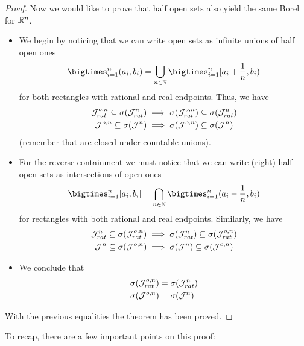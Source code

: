 \begin{proof}
	Now we would like to prove that half open sets also yield the same Borel \siga for $\mathbb{R}^n$.
	\begin{itemize}
		\item We begin by noticing that we can write open sets as infinite unions of half open ones
		\begin{align*}
		\bigtimes_{i = 1}^n (a_i , b_i) = \bigcup_{n \in \N} \bigtimes_{i = 1}^n [a_i + \frac{1}{n}, b_i)
		\end{align*}
		for both rectangles with rational and real endpoints. Thus, we have
		\begin{align*}
		\mathcal{J}_{rat}^{o,n} \subseteq \sigma(\mathcal{J}_{rat}^n) &\implies \sigma(\mathcal{J}_{rat}^{o,n}) \subseteq \sigma(\mathcal{J}_{rat}^n) \\
		\mathcal{J}^{o,n} \subseteq \sigma(\mathcal{J}^n) &\implies \sigma(\mathcal{J}^{o,n}) \subseteq \sigma(\mathcal{J}^n)
		\end{align*}
		(remember that \sigas are closed under countable unions).
		\item For the reverse containment we must notice that we can write (right) half-open sets as intersections of open ones
		\begin{align*}
		\bigtimes_{i = 1}^n [a_i, b_i] = \bigcap_{n \in \N} \bigtimes_{i = 1}^n (a_i - \frac{1}{n}, b_i)
		\end{align*}
		for rectangles with both rational and real endpoints. Similarly, we have
		\begin{align*}
		\mathcal{J}_{rat}^n \subseteq \sigma(\mathcal{J}_{rat}^{o,n}) &\implies \sigma(\mathcal{J}_{rat}^n) \subseteq \sigma(\mathcal{J}_{rat}^{o,n}) \\
		\mathcal{J}^n \subseteq \sigma(\mathcal{J}^{o,n}) &\implies \sigma(\mathcal{J}^n) \subseteq \sigma(\mathcal{J}^{o,n})
		\end{align*}
		\item We conclude that
		\begin{align*}
		\sigma(\mathcal{J}_{rat}^{o,n}) &= \sigma(\mathcal{J}_{rat}^n) \\ \sigma(\mathcal{J}^{o,n}) &= \sigma(\mathcal{J}^n)
		\end{align*}
	\end{itemize}
	With the previous equalities the theorem has been proved.
\end{proof}

To recap, there are a few important points on this proof:


